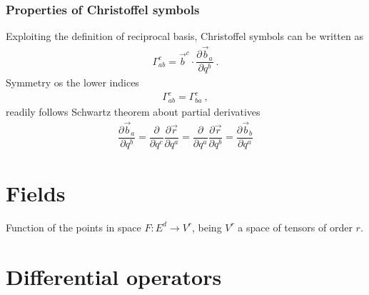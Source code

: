 \documentclass[letterpaper,10pt,english]{jupyterBook}
\begin{document}
\subsubsection*{Properties of Christoffel symbols}

\sphinxAtStartPar
Exploiting the definition of reciprocal basis, Christoffel symbols can be written as
\begin{equation*}
\begin{split}\Gamma_{ab}^c = \vec{b}^c \cdot \dfrac{\partial \vec{b}_a}{\partial q^b} \ .\end{split}
\end{equation*}
\sphinxAtStartPar
{} Symmetry os the lower indices
\begin{equation*}
\begin{split}\Gamma_{ab}^{c} = \Gamma_{ba}^c \ ,\end{split}
\end{equation*}
\sphinxAtStartPar
readily follows Schwartz theorem about partial derivatives
\begin{equation*}
\begin{split}\dfrac{\partial \vec{b}_a}{\partial q^b} = \dfrac{\partial}{\partial q^c}\dfrac{\partial \vec{r}}{\partial q^a} = \dfrac{\partial}{\partial q^a}\dfrac{\partial \vec{r}}{\partial q^b} = \dfrac{\partial \vec{b}_b}{\partial q^a}\end{split}
\end{equation*}

\section{Fields}
\label{\detokenize{ch/tensor-algebra-calculus/calculus-euclidean:fields}}\label{\detokenize{ch/tensor-algebra-calculus/calculus-euclidean:tensor-calculus-fields}}
\sphinxAtStartPar
Function of the points in space \(F: E^d \rightarrow V^r\), being \(V^r\) a space of tensors of order \(r\).


\section{Differential operators}
\label{\detokenize{ch/tensor-algebra-calculus/calculus-euclidean:differential-operators}}\label{\detokenize{ch/tensor-algebra-calculus/calculus-euclidean:tensor-calculus-differential-operators}}
\end{document}
